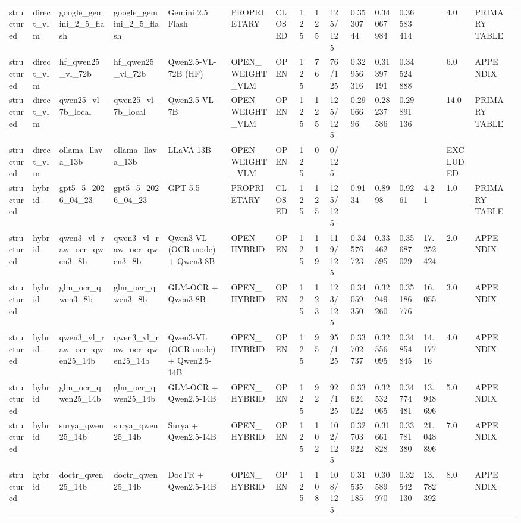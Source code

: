 \begin{table}
\begin{tabular}{lllllllllllllllll}
structured & direct\_vlm & google\_gemini\_2\_5\_flash & google\_gemini\_2\_5\_flash & Gemini 2.5 Flash & PROPRIETARY & CLOSED & 125 & 125 & 125/125 & 0.3530744 & 0.34067984 & 0.36583414 &  & 4.0 & PRIMARY TABLE &  \\
structured & direct\_vlm & hf\_qwen25\_vl\_72b & hf\_qwen25\_vl\_72b & Qwen2.5-VL-72B (HF) & OPEN\_WEIGHT\_VLM & OPEN & 125 & 76 & 76/125 & 0.32956316 & 0.31397191 & 0.34524888 &  & 6.0 & APPENDIX &  \\
structured & direct\_vlm & qwen25\_vl\_7b\_local & qwen25\_vl\_7b\_local & Qwen2.5-VL-7B & OPEN\_WEIGHT\_VLM & OPEN & 125 & 125 & 125/125 & 0.2906696 & 0.28237586 & 0.29891136 &  & 14.0 & PRIMARY TABLE &  \\
structured & direct\_vlm & ollama\_llava\_13b & ollama\_llava\_13b & LLaVA-13B & OPEN\_WEIGHT\_VLM & OPEN & 125 & 0 & 0/125 &  &  &  &  & EXCLUDED &  &  \\
structured & hybrid & gpt5\_5\_2026\_04\_23 & gpt5\_5\_2026\_04\_23 & GPT-5.5 & PROPRIETARY & CLOSED & 125 & 125 & 125/125 & 0.9134 & 0.8998 & 0.9261 & 4.21 & 1.0 & PRIMARY TABLE &  \\
structured & hybrid & qwen3\_vl\_raw\_ocr\_qwen3\_8b & qwen3\_vl\_raw\_ocr\_qwen3\_8b & Qwen3-VL (OCR mode) + Qwen3-8B & OPEN\_HYBRID & OPEN & 125 & 119 & 119/125 & 0.34576723 & 0.33462595 & 0.35687029 & 17.252424 & 2.0 & APPENDIX &  \\
structured & hybrid & glm\_ocr\_qwen3\_8b & glm\_ocr\_qwen3\_8b & GLM-OCR + Qwen3-8B & OPEN\_HYBRID & OPEN & 125 & 123 & 123/125 & 0.34059350 & 0.32949260 & 0.35186776 & 16.055 & 3.0 & APPENDIX &  \\
structured & hybrid & qwen3\_vl\_raw\_ocr\_qwen25\_14b & qwen3\_vl\_raw\_ocr\_qwen25\_14b & Qwen3-VL (OCR mode) + Qwen2.5-14B & OPEN\_HYBRID & OPEN & 125 & 95 & 95/125 & 0.33702737 & 0.32556095 & 0.34854845 & 14.17716 & 4.0 & APPENDIX &  \\
structured & hybrid & glm\_ocr\_qwen25\_14b & glm\_ocr\_qwen25\_14b & GLM-OCR + Qwen2.5-14B & OPEN\_HYBRID & OPEN & 125 & 92 & 92/125 & 0.33624022 & 0.32532065 & 0.34774481 & 13.948696 & 5.0 & APPENDIX &  \\
structured & hybrid & surya\_qwen25\_14b & surya\_qwen25\_14b & Surya + Qwen2.5-14B & OPEN\_HYBRID & OPEN & 125 & 102 & 102/125 & 0.32703922 & 0.31661828 & 0.33781380 & 21.048896 & 7.0 & APPENDIX &  \\
structured & hybrid & doctr\_qwen25\_14b & doctr\_qwen25\_14b & DocTR + Qwen2.5-14B & OPEN\_HYBRID & OPEN & 125 & 108 & 108/125 & 0.31535185 & 0.30589970 & 0.32542130 & 13.782392 & 8.0 & APPENDIX &  \\

\end{tabular}
\end{table}

